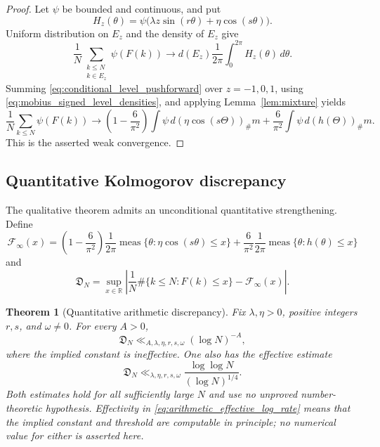 \documentclass[11pt]{amsart}
\numberwithin{equation}{section}\setcounter{tocdepth}{3}\setcounter{secnumdepth}{3}
\newtheorem{theorem}{Theorem}[section]\newtheorem{proposition}[theorem]{Proposition}
\begin{document}
\begin{proof}
Let $\psi$ be bounded and continuous, and put
\begin{equation}
 H_z(\theta)=\psi\bigl(\lambda z\sin(r\theta)+\eta\cos(s\theta)\bigr).
 \label{eq:arithmetic_test_functions}
\end{equation}
Uniform distribution on $E_z$ and the density of $E_z$ give
\begin{equation}
 \frac1N\sum_{\substack{k\le N\\k\in E_z}}\psi(F(k))
 \longrightarrow
 d(E_z)\frac1{2\pi}\int_0^{2\pi}H_z(\theta)\,d\theta.
 \label{eq:conditional_level_pushforward}
\end{equation}
Summing \eqref{eq:conditional_level_pushforward} over $z=-1,0,1$, using
\eqref{eq:mobius_signed_level_densities}, and applying Lemma~\ref{lem:mixture} yields
\begin{equation}
 \frac1N\sum_{k\le N}\psi(F(k))
 \longrightarrow
 \left(1-\frac6{\pi^2}\right)\int\psi\,d(\eta\cos(s\Theta))_\#m
 +\frac6{\pi^2}\int\psi\,d(h(\Theta))_\#m.
 \label{eq:arithmetic_weak_limit_test_function}
\end{equation}
This is the asserted weak convergence.
\end{proof}

\subsection{Quantitative Kolmogorov discrepancy}
\label{subsec:quantitative_arithmetic_discrepancy}
The qualitative theorem admits an unconditional quantitative strengthening.  Define
\begin{equation}
 \mathcal F_\infty(x)
 =\left(1-\frac6{\pi^2}\right)
   \frac1{2\pi}\operatorname{meas}\{\theta:\eta\cos(s\theta)\le x\}
 +\frac6{\pi^2}\frac1{2\pi}\operatorname{meas}\{\theta:h(\theta)\le x\}
 \label{eq:arithmetic_limiting_cdf}
\end{equation}
and
\begin{equation}
 \mathfrak D_N
 =\sup_{x\in\mathbb R}
 \left|\frac1N\#\{k\le N:F(k)\le x\}-\mathcal F_\infty(x)\right|.
 \label{eq:arithmetic_kolmogorov_discrepancy}
\end{equation}

\begin{theorem}[Quantitative arithmetic discrepancy]
\label{thm:quantitative_arithmetic_discrepancy}
Fix $\lambda,\eta>0$, positive integers $r,s$, and $\omega\ne0$.  For every $A>0$,
\begin{equation}
 \mathfrak D_N\ll_{A,\lambda,\eta,r,s,\omega}(\log N)^{-A},
 \label{eq:arithmetic_arbitrary_log_rate}
\end{equation}
where the implied constant is ineffective.  One also has the effective estimate
\begin{equation}
 \mathfrak D_N\ll_{\lambda,\eta,r,s,\omega}
 \frac{\log\log N}{(\log N)^{1/4}}.
 \label{eq:arithmetic_effective_log_rate}
\end{equation}
Both estimates hold for all sufficiently large $N$ and use no unproved
number-theoretic hypothesis.  Effectivity in \eqref{eq:arithmetic_effective_log_rate}
means that the implied constant and threshold are computable in principle; no numerical
value for either is asserted here.
\end{theorem}
\end{document}
